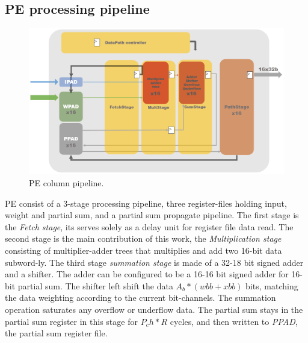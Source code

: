 \subsection{PE processing pipeline}
\begin{figure}[h]
    \centering
    \includegraphics[width=1\linewidth]{inc/4_proposed_architecture/figure/PE.png}
    \caption{PE column pipeline.}
    \label{fig:pe}
\end{figure}
PE consist of a 3-stage processing pipeline, three register-files holding input, weight and partial sum, and a partial sum propagate pipeline. The first stage is the \textit{Fetch stage}, its serves solely as a delay unit for register file data read. The second stage is the main contribution of this work, the \textit{Multiplication stage} consisting of multiplier-adder trees that multiplies and add two 16-bit data subword-ly. The third stage \textit{summation stage} is made of a 32-18 bit signed adder and a shifter. The adder can be configured to be a 16-16 bit signed adder for 16-bit partial sum. The shifter left shift the data $A_b*(wbb+xbb)$ bits, matching the data weighting according to the current bit-channels. The summation operation saturates any overflow or underflow data. The partial sum stays in the partial sum register in this stage for $P_ch*R$ cycles, and then written to \textit{PPAD}, the partial sum register file. \\
